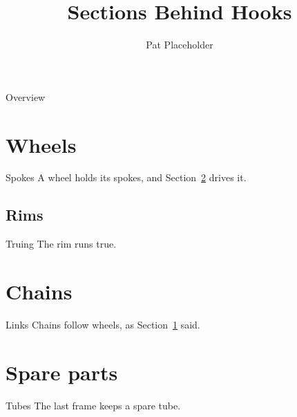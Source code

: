 \documentclass[aspectratio=169]{beamer}
\title{Sections Behind Hooks}
\author{Pat Placeholder}
\date{}
\begin{document}
\maketitle

\begin{frame}{Overview}
  \tableofcontents
\end{frame}

\section{Wheels}\label{sec:wheels}

\begin{frame}{Spokes}
  A wheel holds its spokes, and Section~\ref{sec:chains} drives it.
\end{frame}

\subsection{Rims}

\begin{frame}{Truing}
  The rim runs true.
\end{frame}

\section{Chains}\label{sec:chains}

\begin{frame}{Links}
  Chains follow wheels, as Section~\ref{sec:wheels} said.
\end{frame}

\section*{Spare parts}

\begin{frame}{Tubes}
  The last frame keeps a spare tube.
\end{frame}
\end{document}
